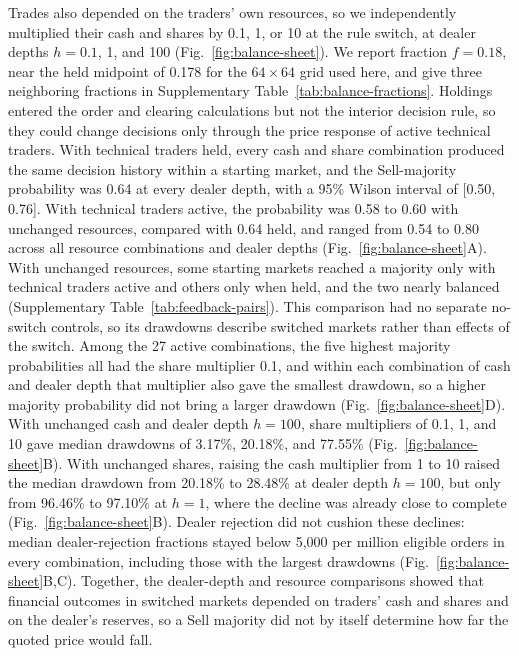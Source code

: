 Trades also depended on the traders' own resources, so we independently
multiplied their cash and shares by 0.1, 1, or 10 at the rule switch,
at dealer depths $h=0.1$, 1, and 100 (Fig.~\ref{fig:balance-sheet}). We
report fraction $f=0.18$, near the held midpoint of 0.178 for the
$64\times64$ grid used here, and give three neighboring fractions in Supplementary
Table~\ref{tab:balance-fractions}. Holdings entered the order and
clearing calculations but not the interior decision rule, so they could
change decisions only through the price response of active technical
traders. With technical traders held, every cash and share combination
produced the same decision history within a starting market, and the
Sell-majority probability was 0.64 at every dealer depth, with a 95\%
Wilson interval of [0.50, 0.76]. With technical traders active, the
probability was 0.58 to 0.60 with unchanged resources, compared with
0.64 held, and ranged from 0.54 to 0.80 across all resource
combinations and dealer depths (Fig.~\ref{fig:balance-sheet}A). With
unchanged resources, some starting markets reached a majority only with
technical traders active and others only when held, and the two nearly
balanced (Supplementary Table~\ref{tab:feedback-pairs}). This comparison had no separate
no-switch controls, so its drawdowns describe switched markets rather
than effects of the switch. Among the 27 active combinations, the five
highest majority probabilities all had the share multiplier 0.1, and
within each combination of cash and dealer depth that multiplier also
gave the smallest drawdown, so a higher majority probability did not
bring a larger drawdown (Fig.~\ref{fig:balance-sheet}D). With unchanged cash
and dealer depth $h=100$, share multipliers of 0.1, 1, and 10 gave
median drawdowns of 3.17\%, 20.18\%, and 77.55\%
(Fig.~\ref{fig:balance-sheet}B). With unchanged shares, raising the
cash multiplier from 1 to 10 raised the median drawdown from 20.18\% to
28.48\% at dealer depth $h=100$, but only from 96.46\% to 97.10\% at
$h=1$, where the decline was already close to complete
(Fig.~\ref{fig:balance-sheet}B). Dealer
rejection did not cushion these declines: median dealer-rejection
fractions stayed below 5,000 per million eligible orders in every
combination, including those with the largest drawdowns
(Fig.~\ref{fig:balance-sheet}B,C). Together, the dealer-depth and
resource comparisons showed that financial outcomes in switched markets
depended on traders' cash and shares and on the dealer's reserves, so a
Sell majority did not by itself determine how far the quoted price
would fall.
